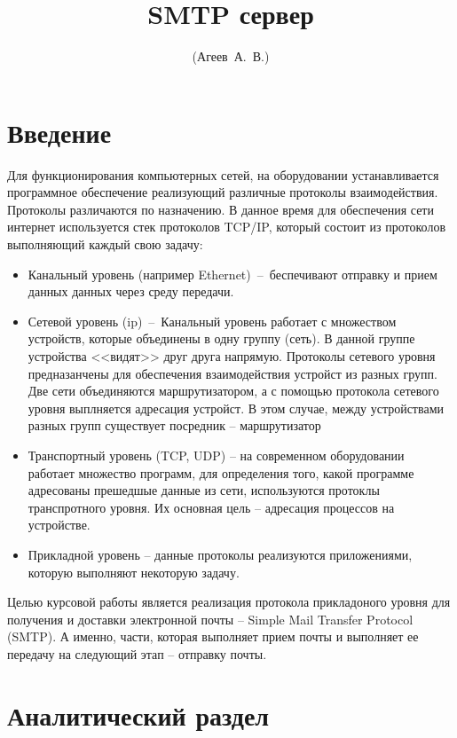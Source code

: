 \documentclass[a4paper,12pt]{report}
\title{SMTP сервер\textnumero 1}
\author{(Агеев~А.~В.)}
\begin{document}
	\maketitle

	\tableofcontents

	\chapter*{Введение}
	Для функционирования компьютерных сетей, на оборудовании устанавливается программное обеспечение реализующий различные протоколы взаимодействия. Протоколы различаются по назначению. В данное время для обеспечения сети интернет используется стек протоколов TCP/IP, который состоит из протоколов выполняющий каждый свою задачу:
	\begin{itemize}
		\item Канальный уровень (например Ethernet)~--~беспечивают отправку и прием данных данных через среду передачи.
		\item Сетевой уровень (ip)~--~Канальный уровень работает с множеством устройств, которые объединены в одну группу (сеть). В данной группе устройства <<видят>> друг друга напрямую. Протоколы сетевого уровня предназанчены для обеспечения взаимодействия устройст из разных групп. Две сети объединяются маршрутизатором, а с помощью протокола сетевого уровня выплняется адресация устройст. В этом случае, между устройствами разных групп существует посредник -- маршрутизатор
		\item Транспортный уровень (TCP, UDP) -- на современном оборудовании работает множество программ, для определения того, какой программе адресованы прешедшые данные из сети, используются протоклы транспротного уровня. Их основная цель -- адресация процессов на устройстве.
		\item Прикладной уровень -- данные протоколы реализуются приложениями, которую выполняют некоторую задачу. 
	\end{itemize}

	Целью курсовой работы является реализация протокола прикладоного уровня для получения и доставки электронной почты -- Simple Mail Transfer Protocol (SMTP). А именно, части, которая выполняет прием почты и выполняет ее передачу на следующий этап -- отправку почты.

	\chapter{Аналитический раздел}
\end{document}
